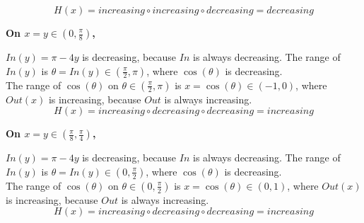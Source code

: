 \documentclass{ximera}
\begin{document}
\[
H(x) = increasing \circ increasing \circ decreasing = decreasing
\]

















\textbf{\textcolor{purple!80!black}{On $x = y \in \left( 0, \frac{\pi}{8} \right)$, }}



$In(y) = \pi - 4y$ is decreasing, because $In$ is always decreasing.  The range of $In(y)$ is $\theta = In(y) \in \left(\frac{\pi}{2}, \pi \right)$, where $\cos(\theta)$ is decreasing. \\



The range of $\cos(\theta)$ on $\theta \in \left(\frac{\pi}{2}, \pi \right)$ is $x = \cos(\theta) \in (-1, 0)$, where $Out(x)$ is increasing, because $Out$ is always increasing. \\


\[
H(x) = increasing \circ decreasing \circ decreasing = increasing
\]















\textbf{\textcolor{purple!80!black}{On $x = y \in \left( \frac{\pi}{8}, \frac{\pi}{4} \right)$, }}



$In(y) = \pi - 4y$ is decreasing, because $In$ is always decreasing.  The range of $In(y)$ is $\theta = In(y) \in \left(0, \frac{\pi}{2} \right)$, where $\cos(\theta)$ is decreasing. \\



The range of $\cos(\theta)$ on $\theta \in \left(0, \frac{\pi}{2} \right)$ is $x = \cos(\theta) \in (0, 1)$, where $Out(x)$ is increasing, because $Out$ is always increasing. \\


\[
H(x) = increasing \circ decreasing \circ decreasing = increasing
\]
\end{document}
